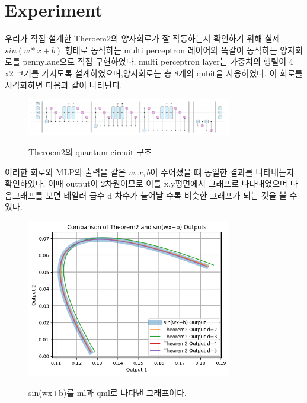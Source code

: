 \section{Experiment}

 우리가 직접 설계한 Theroem2의 양자회로가 잘 작동하는지 확인하기 위해 실제 $sin(w*x+b)$ 형태로 동작하는 multi perceptron 레이어와 똑같이 동작하는 양자회로를 pennylane으로 직접 구현하였다. multi perceptron layer는 가중치의 행렬이 4 x2 크기를 가지도록 설계하였으며,양자회로는 총 8개의 qubit을 사용하였다. 이 회로를 시각화하면 다음과 같이 나타난다.

\begin{figure}[h]
    \centering
        \includegraphics[scale=0.5, width=0.8\textwidth]{figs/theorem2_circuit_12110900.png}\
\caption{Theroem2의 quantum circuit 구조}
\label{fig:Theroem2-cricuit}
\end{figure}

이러한 회로와 MLP의 출력을 같은 $w , x, b$이 주어졌을 떄 동일한 결과를 나타내는지 확인하였다. 이때 output이 2차원이므로 이를 x,y평면에서 그래프로 나타내었으며 다음그래프를 보면 테일러 급수 d 차수가 늘어날 수록 비슷한 그래프가 되는 것을 볼 수 있다.

\begin{figure}[h]
    \centering
        \includegraphics[scale=0.5, width=0.8\textwidth]{figs/output_theorem2_1211.png}\
\caption{sin(wx+b)를 ml과 qml로 나타낸 그래프이다.}
\label{fig:Theroem2-Experiment}
\end{figure}
